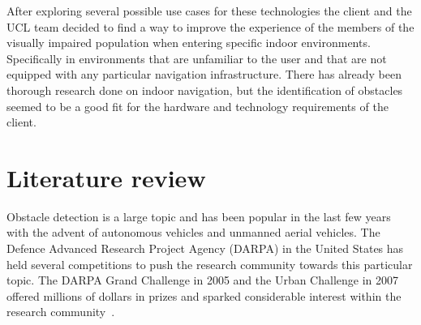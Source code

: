 \documentclass[prodmode,acmtosem]{acmsmall} %
\begin{document}
After exploring several possible use cases for these technologies the client and the UCL team decided to find a way to improve the experience of the members of the visually impaired population when entering specific indoor environments.
Specifically in environments that are unfamiliar to the user and that are not equipped with any particular navigation infrastructure. There has already been thorough research done on indoor navigation, but the identification of obstacles seemed to be a good fit for the hardware and technology requirements of the client.

\section{Literature review} %
Obstacle detection is a large topic and has been popular in the last few years with the advent of autonomous vehicles and unmanned aerial vehicles.
The Defence Advanced Research Project Agency (DARPA) in the United States has held several competitions to push the research community towards this particular topic. The DARPA Grand Challenge in 2005 and the Urban Challenge in 2007 offered millions of dollars in prizes and sparked considerable interest within the research community~\cite{DARPAGrandChallenge2005,DARPAUrbanChallenge2007}.
\end{document}
